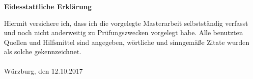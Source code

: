 \begin{center}
 	\Large\textbf{Eidesstattliche Erklärung}\\
\end{center}
Hiermit versichere ich, dass ich die vorgelegte Masterarbeit selbstständig verfasst und noch nicht
anderweitig zu Prüfungszwecken vorgelegt habe. Alle benutzten Quellen und Hilfsmittel sind
angegeben, wörtliche und sinngemäße Zitate wurden als solche gekennzeichnet.\\\\
Würzburg, den 12.10.2017\\\\

\newpage